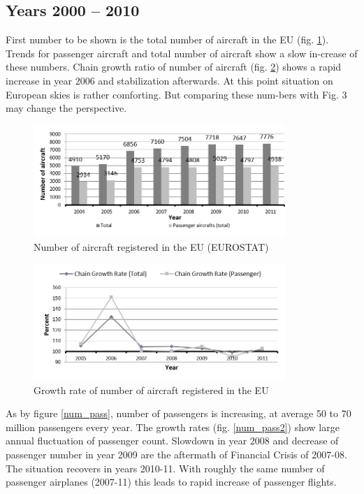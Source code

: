 \subsection{Years 2000 -- 2010}

First number to be shown is the total number of aircraft in the EU (fig. \ref{num_aircraft}). Trends for passenger aircraft and total number of aircraft show a slow in-crease of these numbers. Chain growth ratio of number of aircraft (fig. \ref{num_aircraft2}) shows a rapid increase in year 2006 and stabilization afterwards. At this point situation on European skies is rather comforting. But comparing these num-bers with Fig. 3 may change the perspective.

\begin{figure}[h!]
\centering %
\includegraphics[width=0.85\textwidth]{Pictures/num_aircraft.png}
\caption{Number of aircraft registered in the EU (EUROSTAT)}
\label{num_aircraft}
\end{figure}

\begin{figure}[h!]
\centering %
\includegraphics[width=0.85\textwidth]{Pictures/num_aircraft2.png}
\caption{Growth rate of number of aircraft registered in the EU}
\label{num_aircraft2}
\end{figure}

As by figure \ref{num_pass}, number of passengers is increasing, at average 50 to 70 million passengers every year. The growth rates (fig. \ref{num_pass2}) show large annual fluctuation of passenger count. Slowdown in year 2008 and decrease of passenger number in year 2009 are the aftermath of Financial Crisis of 2007-08. The situation recovers in years 2010-11. With roughly the same number of passenger airplanes (2007-11) this leads to rapid increase of passenger flights.


